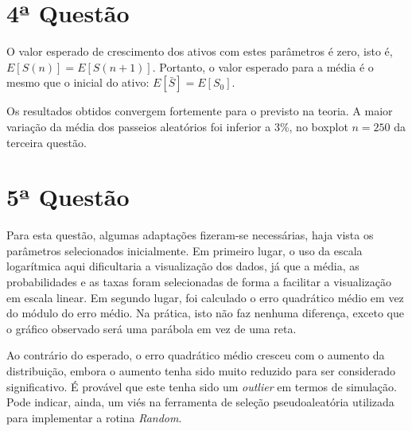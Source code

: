 \documentclass{article}
\begin{document}

\section*{4ª Questão}

O valor esperado de crescimento dos ativos com estes parâmetros é zero, isto é, $E[S(n)] = E[S(n+1)]$.
Portanto, o valor esperado para a média é o mesmo que o inicial do ativo: $E[\bar{S}] = E[S_{0}]$.

Os resultados obtidos convergem fortemente para o previsto na teoria.
A maior variação da média dos passeios aleatórios foi inferior a 3\%, no boxplot $n = 250$ da terceira questão.




\section*{5ª Questão}

Para esta questão, algumas adaptações fizeram-se necessárias, haja vista os parâmetros selecionados inicialmente.
Em primeiro lugar, o uso da escala logarítmica aqui dificultaria a visualização dos dados, já que a média, as probabilidades e as taxas foram selecionadas de forma a facilitar a visualização em escala linear.
Em segundo lugar, foi calculado o erro quadrático médio em vez do módulo do erro médio.
Na prática, isto não faz nenhuma diferença, exceto que o gráfico observado será uma parábola em vez de uma reta.

Ao contrário do esperado, o erro quadrático médio cresceu com o aumento da distribuição, embora o aumento tenha sido muito reduzido para ser considerado significativo. 
É provável que este tenha sido um \emph{outlier} em termos de simulação. 
Pode indicar, ainda, um viés na ferramenta de seleção pseudoaleatória utilizada para implementar a rotina \emph{Random}.
\end{document}

